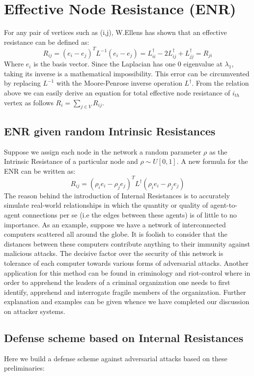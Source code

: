 \documentclass{article}
\begin{document}
	\section{Effective Node Resistance (ENR)}
	For any pair of vertices such as (i,j), W.Ellens \cite{ellens2013graph} has shown that an effective resistance can be defined as:
	\begin{equation}
		R_{ij} = (e_i-e_j)^T  L^{-1} (e_i-e_j) = L_{ii}^{\dag} -2L_{ij}^{\dag} + L_{jj}^{\dag}= R_{ji}
	\end{equation}
	Where $e_i$ is the basis vector. Since the Laplacian has one 0 eigenvalue at $\lambda_1$, taking its inverse is a mathematical impossibility. This error can be circumvented by replacing $L^{-1}$ with the Moore-Penrose inverse operation $L^\dag$. From the relation above we can easily derive an equation for total effective node resistance of $i_{th}$ vertex as follows $R_i = \sum_{j\in V}R_{ij}$.
	
	\subsection{ENR given random Intrinsic Resistances}
	Suppose we assign each node in the network a random parameter $\rho$ as the Intrinsic Resistance of a particular node and $\rho \sim U[0,1]$. A new formula for the ENR can be written as:
	\begin{equation}
		R_{ij} = (\rho_i e_i - \rho_j e_j)^T L^{\dag} (\rho_i e_i - \rho_j e_j)
	\end{equation}
	The reason behind the introduction of Internal Resistances is to accurately simulate real-world relationships in which the quantity or quality of agent-to-agent connections per se (i.e the edges between these agents) is of little to no importance. As an example, suppose we have a network of interconnected computers scattered all around the globe. It is foolish to consider that the distances between these computers contribute anything to their immunity against malicious attacks. The decisive factor over the security of this network is tolerance of each computer towards various forms of adversarial attacks. Another application for this method can be found in criminology and riot-control where in order to apprehend the leaders of a criminal organization one needs to first identify, apprehend and interrogate fragile members of the organization. Further explanation and examples can be given whence we have completed our discussion on attacker systems.
	\subsection{Defense scheme based on Internal Resistances}
	Here we build a defense scheme against adversarial attacks based on these preliminaries:
	
\end{document}

